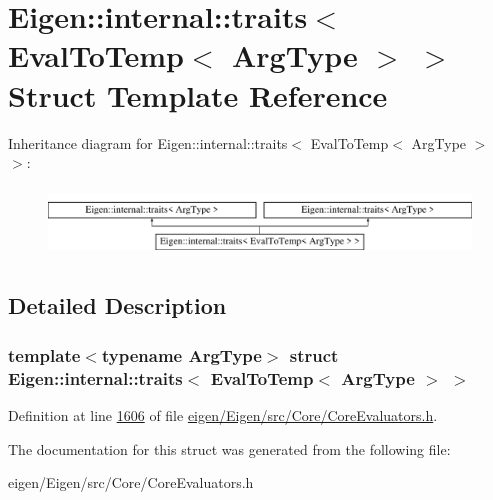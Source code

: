 \hypertarget{struct_eigen_1_1internal_1_1traits_3_01_eval_to_temp_3_01_arg_type_01_4_01_4}{}\section{Eigen\+:\+:internal\+:\+:traits$<$ Eval\+To\+Temp$<$ Arg\+Type $>$ $>$ Struct Template Reference}
\label{struct_eigen_1_1internal_1_1traits_3_01_eval_to_temp_3_01_arg_type_01_4_01_4}
Inheritance diagram for Eigen\+:\+:internal\+:\+:traits$<$ Eval\+To\+Temp$<$ Arg\+Type $>$ $>$\+:\begin{figure}[H]
\begin{center}
\leavevmode
\includegraphics[height=1.872910cm]{struct_eigen_1_1internal_1_1traits_3_01_eval_to_temp_3_01_arg_type_01_4_01_4}
\end{center}
\end{figure}


\subsection{Detailed Description}
\subsubsection*{template$<$typename Arg\+Type$>$\newline
struct Eigen\+::internal\+::traits$<$ Eval\+To\+Temp$<$ Arg\+Type $>$ $>$}



Definition at line \hyperlink{eigen_2_eigen_2src_2_core_2_core_evaluators_8h_source_l01606}{1606} of file \hyperlink{eigen_2_eigen_2src_2_core_2_core_evaluators_8h_source}{eigen/\+Eigen/src/\+Core/\+Core\+Evaluators.\+h}.



The documentation for this struct was generated from the following file\+:\begin{DoxyCompactItemize}
\item 
eigen/\+Eigen/src/\+Core/\+Core\+Evaluators.\+h\end{DoxyCompactItemize}
